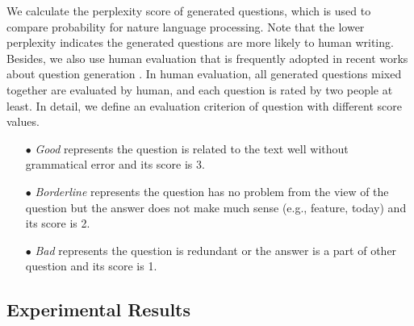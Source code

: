 \documentclass[runningheads,UTF8,article]{comsis2}
\begin{document}
	We calculate the perplexity \cite{Popel} score of generated questions, which is used to compare probability for nature language processing. Note that the lower perplexity indicates the generated questions are more likely to human writing.
	Besides, we also use human evaluation that is frequently adopted in recent works about question generation \cite{DBLP:journals/corr/DuSC17,Susanti2017,lindberg2013generating}. In human evaluation, all generated questions mixed together are evaluated by human, and each question is rated by two people at least. In detail, we define an evaluation criterion of question with different score values.
	\begin{itemize}
		\item[$\bullet$]{\emph{Good} represents the question is related to the text well without grammatical error and its score is 3.}
		\item[$\bullet$]{\emph{Borderline} represents the question has no problem from the view of the question but the answer does not make much sense (e.g., feature, today) and its score is 2.}
		\item[$\bullet$]{\emph{Bad} represents the question is redundant or the answer is a part of other question and its score is 1.}
	\end{itemize}
	
	
	
	\subsection{Experimental Results}
	
\end{document}
